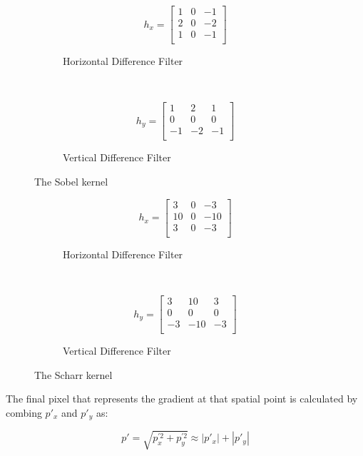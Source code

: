\begin{figure}[H]
\centering
\begin{subfigure}[b]{.45\linewidth}
	\[
	h_x = \left[
	\begin{array}{rrr}
	1 & 0 & -1 \\
	2 & 0 & -2 \\
	1 & 0 & -1 \\
	\end{array}
	\right]
	\]
	\caption{Horizontal Difference Filter}
\end{subfigure}
~
\begin{subfigure}[b]{.45\linewidth}
	\[
	h_y = \left[
	\begin{array}{rrr}
	1 & 2 & 1 \\
	0 & 0 & 0 \\
	-1 & -2 & -1\\
	\end{array}
	\right]
	\]
	\caption{Vertical Difference Filter}
\end{subfigure}
\caption{The Sobel kernel}
\end{figure}



\begin{figure}[H]
\centering
\begin{subfigure}[b]{.45\linewidth}
	\[
	h_x = \left[
	\begin{array}{rrr}
	3  & 0 & -3 \\
	10 & 0 & -10 \\
	3  & 0 & -3 \\
	\end{array}
	\right]
	\]
	\caption{Horizontal Difference Filter}
\end{subfigure}
~
\begin{subfigure}[b]{.45\linewidth}
	\[
	h_y = \left[
	\begin{array}{rrr}
	3 & 10 & 3 \\
	0 & 0 & 0 \\
	-3 & -10 & -3\\
	\end{array}
	\right]
	\]
	\caption{Vertical Difference Filter}
\end{subfigure}
\caption{The Scharr kernel}
\end{figure}

The final pixel that represents the gradient at that spatial point
is calculated by combing $p'_x$ and $p'_y$ as:

\[	p' = \sqrt{p_x^{'2} + p_y^{'2}} \approx |p'_x| + |p'_y|  \]

